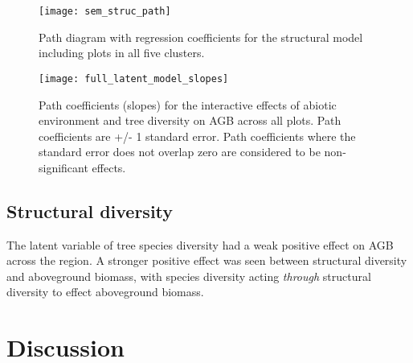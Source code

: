 \documentclass[11pt,a4paper]{article}
\begin{document}
\begin{figure}[H]
\centering
	\texttt{[image: sem\_struc\_path]}
	\caption{Path diagram with regression coefficients for the structural model including plots in all five clusters.}
	\label{sem_struc_path}
\end{figure}

\begin{figure}[H]
\centering
	\texttt{[image: full\_latent\_model\_slopes]}
	\caption{Path coefficients (slopes) for the interactive effects of abiotic environment and tree diversity on AGB across all plots. Path coefficients are +/- 1 standard error. Path coefficients where the standard error does not overlap zero are considered to be non-significant effects.}
	\label{full_latent_model_slopes}
\end{figure}

\subsection{Structural diversity}

The latent variable of tree species diversity had a weak positive effect on AGB across the region. A stronger positive effect was seen between structural diversity and aboveground biomass, with species diversity acting \textit{through} structural diversity to effect aboveground biomass.

\section{Discussion}

%
\end{document}
